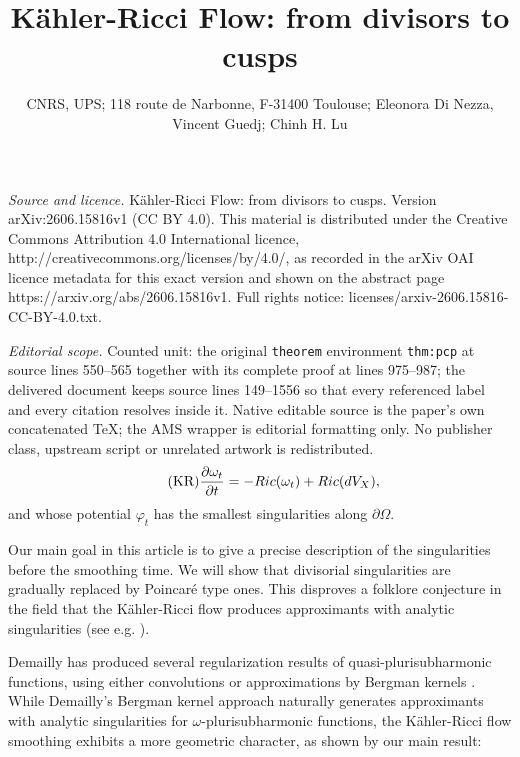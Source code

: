 \documentclass[10pt,a4paper]{amsart}
\numberwithin{equation}{section}
\newcommand{\f}{\varphi}
\begin{document}
\title[K"ahler-Ricci Flow: from divisors to cusps]{K\"ahler-Ricci Flow: from divisors to cusps}
\author{CNRS, UPS; 118 route de Narbonne, F-31400 Toulouse; Eleonora Di Nezza, Vincent Guedj; Chinh H. Lu}
\date{}
\maketitle
\noindent\emph{Source and licence.} K\"ahler-Ricci Flow: from divisors to cusps. Version arXiv:2606.15816v1 (CC BY 4.0). This material is distributed under the Creative Commons Attribution 4.0 International licence, http://creativecommons.org/licenses/by/4.0/, as recorded in the arXiv OAI licence metadata for this exact version and shown on the abstract page https://arxiv.org/abs/2606.15816v1. Full rights notice: licenses/arxiv-2606.15816-CC-BY-4.0.txt.\par\smallskip
\noindent\textit{Editorial scope.} Counted unit: the original \texttt{theorem} environment \texttt{thm:pcp} at source lines 550--565 together with its complete proof at lines 975--987; the delivered document keeps source lines 149--1556 so that every referenced label and every citation resolves inside it. Native editable source is the paper's own concatenated TeX; the AMS wrapper is editorial formatting only. No publisher class, upstream script or unrelated artwork is redistributed.
\begin{equation*} \label{eq:KR}
\tag{KR}
\frac{\partial \omega_t}{\partial t}=-{\rm Ric}(\omega_t)+{\rm Ric}(dV_X),
\end{equation*}
and whose potential $\f_t$ has the smallest singularities along $\partial \Omega$.

 

Our main goal in this article  is to give a precise description of the singularities before the smoothing time.
We will show that divisorial singularities are gradually replaced by Poincaré type ones.
This disproves  a folklore conjecture in the field that the K\"ahler-Ricci flow produces approximants with analytic singularities 
(see e.g. \cite[Question 43]{DGZ16}).

\smallskip

Demailly has produced several regularization results of quasi-plurisubharmonic functions, using either 
convolutions \cite{Dem92} or approximations by Bergman kernels \cite{DPS01}.
While Demailly's Bergman kernel approach naturally generates approximants with analytic singularities 
for $\omega$-plurisubharmonic functions,  
the K\"ahler-Ricci flow smoothing exhibits a more geometric character,
as shown by our main result:
 
\end{document}
